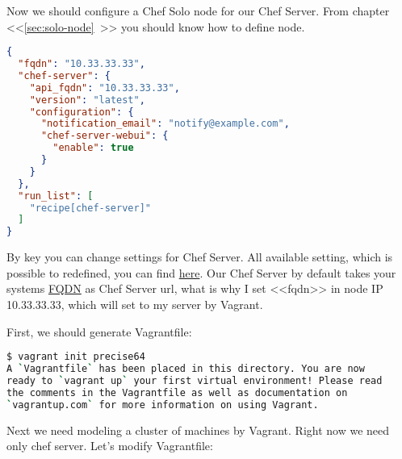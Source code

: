 Now we should configure a Chef Solo node for our Chef Server. From chapter <<\ref{sec:solo-node}~>> you should know how to define node.

\begin{lstlisting}[language=JSON,label=lst:my-server-cloud-installation4,title=my-server-cloud/nodes/chef-server.example.com.json]
{
  "fqdn": "10.33.33.33",
  "chef-server": {
    "api_fqdn": "10.33.33.33",
    "version": "latest",
    "configuration": {
      "notification_email": "notify@example.com",
      "chef-server-webui": {
        "enable": true
      }
    }
  },
  "run_list": [
    "recipe[chef-server]"
  ]
}
\end{lstlisting}

By  key you can change settings for Chef Server. All available setting, which is possible to redefined, you can find \href{https://github.com/opscode/omnibus-chef-server/blob/master/files/chef-server-cookbooks/chef-server/attributes/default.rb}{here}. Our Chef Server by default takes your systems \href{http://en.wikipedia.org/wiki/Fully\_qualified\_domain\_name}{FQDN} as Chef Server url, what is why I set <<fqdn>> in node IP 10.33.33.33, which will set to my server by Vagrant.

First, we should generate Vagrantfile:

\begin{lstlisting}[language=Bash,label=lst:my-server-cloud-installation5]
$ vagrant init precise64
A `Vagrantfile` has been placed in this directory. You are now
ready to `vagrant up` your first virtual environment! Please read
the comments in the Vagrantfile as well as documentation on
`vagrantup.com` for more information on using Vagrant.
\end{lstlisting}

Next we need modeling a cluster of machines by Vagrant. Right now we need only chef server. Let's modify Vagrantfile:

